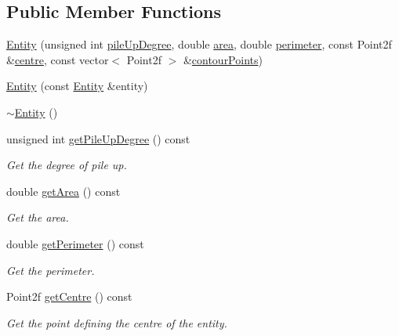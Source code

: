 \subsection*{Public Member Functions}
\begin{DoxyCompactItemize}
\item 
\hyperlink{classmultiscale_1_1analysis_1_1Entity_ab6e9d348e41c7670d52ca2615cdee023}{Entity} (unsigned int \hyperlink{classmultiscale_1_1analysis_1_1Entity_aae78866cef9fcb7bd2e858570f47d082}{pile\-Up\-Degree}, double \hyperlink{classmultiscale_1_1analysis_1_1Entity_a7fad3c67bb46cc0f4ce1fb17ef3e66cc}{area}, double \hyperlink{classmultiscale_1_1analysis_1_1Entity_ac7bcdb1cb5eb4369ca8e44d3dbda44a3}{perimeter}, const Point2f \&\hyperlink{classmultiscale_1_1analysis_1_1Entity_ad226609174b21f71210161d29a16d4ef}{centre}, const vector$<$ Point2f $>$ \&\hyperlink{classmultiscale_1_1analysis_1_1Entity_a0199b0a0e5b22809015ecbc23d17785e}{contour\-Points})
\item 
\hyperlink{classmultiscale_1_1analysis_1_1Entity_ab7136fc011809bc9bcc43862fd4c38ae}{Entity} (const \hyperlink{classmultiscale_1_1analysis_1_1Entity}{Entity} \&entity)
\item 
\hyperlink{classmultiscale_1_1analysis_1_1Entity_adf6d3f7cb1b2ba029b6b048a395cc8ae}{$\sim$\-Entity} ()
\item 
unsigned int \hyperlink{classmultiscale_1_1analysis_1_1Entity_a9984244109e4212e310b0418e894a8c1}{get\-Pile\-Up\-Degree} () const 
\begin{DoxyCompactList}\small\item\em Get the degree of pile up. \end{DoxyCompactList}\item 
double \hyperlink{classmultiscale_1_1analysis_1_1Entity_a5daf3865a5f3bfd4d4dd2fe0262af889}{get\-Area} () const 
\begin{DoxyCompactList}\small\item\em Get the area. \end{DoxyCompactList}\item 
double \hyperlink{classmultiscale_1_1analysis_1_1Entity_ae73ee40bc7adb95614551d6da4b4a4ff}{get\-Perimeter} () const 
\begin{DoxyCompactList}\small\item\em Get the perimeter. \end{DoxyCompactList}\item 
Point2f \hyperlink{classmultiscale_1_1analysis_1_1Entity_ab1f9c4810a5f3d2b58fb6f813354821f}{get\-Centre} () const 
\begin{DoxyCompactList}\small\item\em Get the point defining the centre of the entity. \end{DoxyCompactList}\item 

\end{DoxyCompactItemize}
